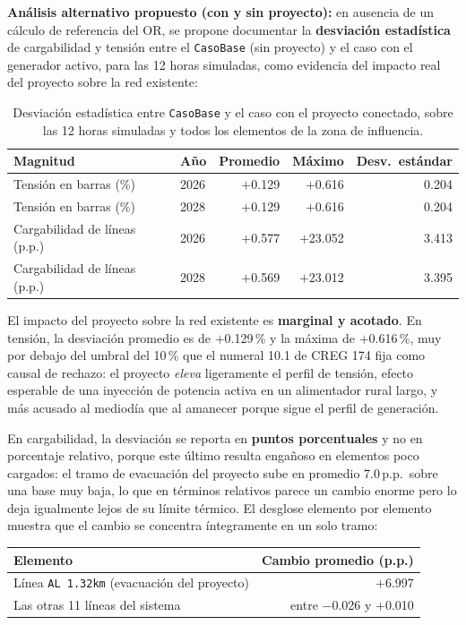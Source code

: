 \documentclass[11pt,a4paper]{article}
\begin{document}
\textbf{An\'alisis alternativo propuesto (con y sin proyecto):} en ausencia de un c\'alculo de referencia del OR, se propone documentar la \textbf{desviaci\'on estad\'istica} de cargabilidad y tensi\'on entre el \texttt{CasoBase} (sin proyecto) y el caso con el generador activo, para las 12 horas simuladas, como evidencia del impacto real del proyecto sobre la red existente:
\begin{table}[H]
\centering
\caption{Desviaci\'on estad\'istica entre \texttt{CasoBase} y el caso con el proyecto conectado, sobre las 12 horas simuladas y todos los elementos de la zona de influencia.}
\begin{tabular}{llrrr}
\toprule
Magnitud & A\~no & Promedio & M\'aximo & Desv.\ est\'andar \\
\midrule
Tensi\'on en barras (\%) & 2026 & $+$0.129 & $+$0.616 & 0.204 \\
Tensi\'on en barras (\%) & 2028 & $+$0.129 & $+$0.616 & 0.204 \\
Cargabilidad de l\'ineas (p.p.) & 2026 & $+$0.577 & $+$23.052 & 3.413 \\
Cargabilidad de l\'ineas (p.p.) & 2028 & $+$0.569 & $+$23.012 & 3.395 \\
\bottomrule
\end{tabular}
\end{table}

El impacto del proyecto sobre la red existente es \textbf{marginal y acotado}. En tensi\'on, la desviaci\'on promedio es de $+$0.129\,\% y la m\'axima de $+$0.616\,\%, muy por debajo del umbral del 10\,\% que el numeral 10.1 de CREG 174 fija como causal de rechazo: el proyecto \emph{eleva} ligeramente el perfil de tensi\'on, efecto esperable de una inyecci\'on de potencia activa en un alimentador rural largo, y m\'as acusado al mediod\'ia que al amanecer porque sigue el perfil de generaci\'on.

En cargabilidad, la desviaci\'on se reporta en \textbf{puntos porcentuales} y no en porcentaje relativo, porque este \'ultimo resulta enga\~noso en elementos poco cargados: el tramo de evacuaci\'on del proyecto sube en promedio 7.0\,p.p.\ sobre una base muy baja, lo que en t\'erminos relativos parece un cambio enorme pero lo deja igualmente lejos de su l\'imite t\'ermico. El desglose elemento por elemento muestra que el cambio se concentra \'integramente en un solo tramo:

\begin{center}
\begin{tabular}{|l|r|}
\hline
\textbf{Elemento} & \textbf{Cambio promedio (p.p.)} \\ \hline
L\'inea \texttt{AL 1.32km} (evacuaci\'on del proyecto) & $+$6.997 \\ \hline
Las otras 11 l\'ineas del sistema & entre $-$0.026 y $+$0.010 \\ \hline
\end{tabular}
\end{center}
\end{document}
